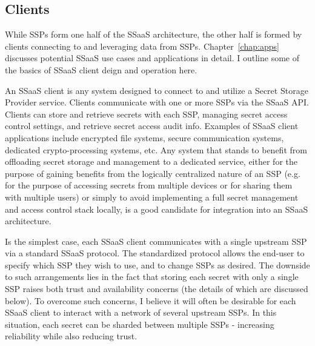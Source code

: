 \subsection{Clients}

While SSPs form one half of the SSaaS architecture, the other half is
formed by clients connecting to and leveraging data from
SSPs. Chapter~\ref{chap:apps} discusses potential SSaaS use cases and
applications in detail. I outline some of the basics of SSaaS client
deign and operation here.

An SSaaS client is any system designed to connect to and utilize a
Secret Storage Provider service. Clients communicate with one or more
SSPs via the SSaaS API. Clients can store and retrieve secrets with
each SSP, managing secret access control settings, and retrieve secret
access audit info. Examples of SSaaS client applications include
encrypted file systems, secure communication systems, dedicated
crypto-processing systems, etc. Any system that stands to benefit from
offloading secret storage and management to a dedicated service,
either for the purpose of gaining benefits from the logically
centralized nature of an SSP (e.g. for the purpose of accessing
secrets from multiple devices or for sharing them with multiple users)
or simply to avoid implementing a full secret management and access
control stack locally, is a good candidate for integration into an
SSaaS architecture.

Is the simplest case, each SSaaS client communicates with a single
upstream SSP via a standard SSaaS protocol. The standardized protocol
allows the end-user to specify which SSP they wish to use, and to
change SSPs as desired. The downside to such arrangements lies in the
fact that storing each secret with only a single SSP raises both trust
and availability concerns (the details of which are discussed
below). To overcome such concerns, I believe it will often be
desirable for each SSaaS client to interact with a network of several
upstream SSPs. In this situation, each secret can be sharded between
multiple SSPs - increasing reliability while also reducing trust.

